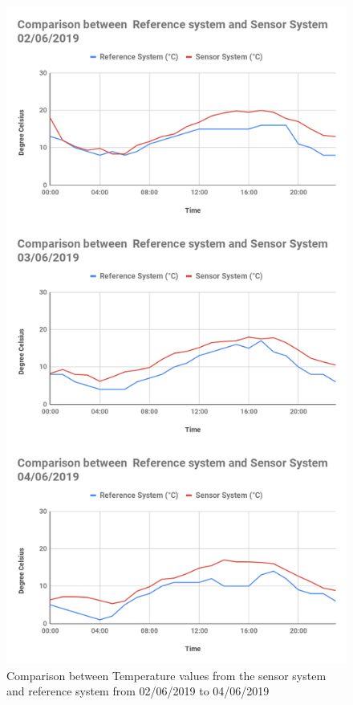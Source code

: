   
  \begin{figure}[h]
    \begin{center}
    \includegraphics[scale=0.45]{images/figure86tem.png}
    \end{center}
    \caption{Comparison between Temperature values from the sensor system and reference system from 02/06/2019 to 04/06/2019}
    \label{temp1}
  
  \end{figure}



